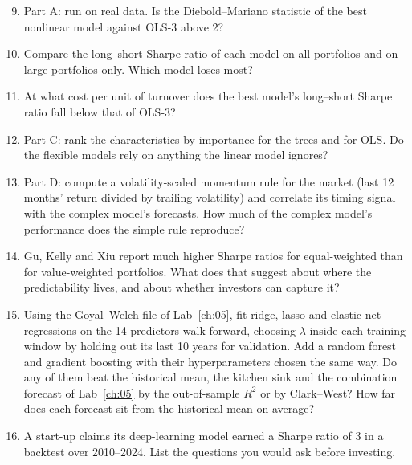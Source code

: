 \begin{enumerate}
  \setcounter{enumi}{8}
  \item Part A: run on real data. Is the Diebold--Mariano statistic of the best nonlinear model against OLS-3 above 2?
  \item Compare the long--short Sharpe ratio of each model on all portfolios and on large portfolios only. Which model loses most?
  \item At what cost per unit of turnover does the best model's long--short Sharpe ratio fall below that of OLS-3?
  \item Part C: rank the characteristics by importance for the trees and for OLS. Do the flexible models rely on anything the linear model ignores?
  \item\label{ex:21-volmom} Part D: compute a volatility-scaled momentum rule for the market (last 12 months' return divided by trailing volatility) and correlate its timing signal with the complex model's forecasts. How much of the complex model's performance does the simple rule reproduce?
  \item Gu, Kelly and Xiu report much higher Sharpe ratios for equal-weighted than for value-weighted portfolios. What does that suggest about where the predictability lives, and about whether investors can capture it?
  \item Using the Goyal--Welch file of Lab~\ref{ch:05}, fit ridge, lasso and elastic-net regressions on the 14 predictors walk-forward, choosing $\lambda$ inside each training window by holding out its last 10 years for validation. Add a random forest and gradient boosting with their hyperparameters chosen the same way. Do any of them beat the historical mean, the kitchen sink and the combination forecast of Lab~\ref{ch:05} by the out-of-sample $R^2$ or by Clark--West? How far does each forecast sit from the historical mean on average?
  \item A start-up claims its deep-learning model earned a Sharpe ratio of 3 in a backtest over 2010--2024. List the questions you would ask before investing.
\end{enumerate}
